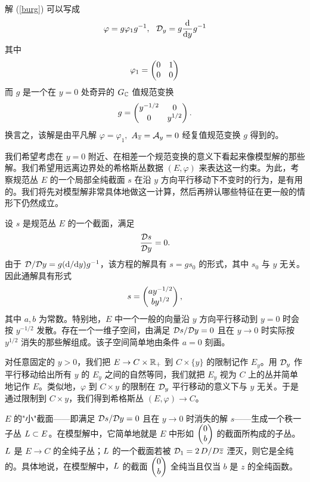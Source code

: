 解 (\ref{burg}) 可以写成
\begin{equation}\label{nolf} \varphi= g\varphi_1 g^{-1},
~~ {\mathcal D}_y=g\frac{{\mathrm d}}{{\mathrm d} y}g^{-1} \end{equation}
其中
\begin{equation}\label{zolf} \varphi_1=\begin{pmatrix} 0 & 1\cr 0 & 0 \end{pmatrix}\end{equation}
而 $g$ 是一个在 $y=0$ 处奇异的 $G_{\mathbb C}$ 值规范变换
\begin{equation}\label{singgauge}
g =\begin{pmatrix} y^{-1/2} & 0 \cr 0 & y^{1/2} \end{pmatrix}.
\end{equation}
换言之，该解是由平凡解 $\varphi=\varphi_1,$ $A_{\overline z}={\mathcal A}_y=0$ 经复值规范变换 $g$ 得到的。

我们希望考虑在 $y=0$ 附近、在相差一个规范变换的意义下看起来像模型解的那些解。我们希望用远离边界处的希格斯丛数据 $(E,\varphi)$ 来表达这一约束。为此，考察规范丛 $E$ 的一个局部全纯截面 $s$ 在沿 $y$ 方向平行移动下不变时的行为，是有用的。我们将先对模型解非常具体地做这一计算，然后再辨认哪些特征在更一般的情形下仍然成立。

设 $s$ 是规范丛 $E$ 的一个截面，满足
\begin{equation}\label{onurf}\frac{{\mathcal D} s}{{\mathcal D} y}=0.\end{equation}
由于 ${\mathcal D}/{\mathcal D} y= g ({\mathrm d}/{\mathrm d} y) g^{-1}$，该方程的解具有 $s= gs_0$ 的形式，其中 $s_0$ 与 $y$ 无关。因此通解具有形式
\begin{equation}\label{wurf} s=\begin{pmatrix} a y^{-1/2}\cr b y^{1/2}\end{pmatrix},\end{equation}
其中 $a,b$ 为常数。特别地，$E$ 中一个一般的向量沿 $y$ 方向平行移动到 $y=0$ 时会按 $y^{-1/2}$ 发散。存在一个一维子空间，由满足 ${\mathcal D} s/{\mathcal D} y=0$ 且在 $y\to 0$ 时实际按 $y^{1/2}$ 消失的那些解组成。该子空间简单地由条件 $a=0$ 刻画。

对任意固定的 $y>0$，我们把 $E\to C\times {\mathbb R}_+$ 到 $C\times \{y\}$ 的限制记作 $E_y$。用 ${\mathcal D}_y$ 作平行移动给出所有 $y$ 的 $E_y$ 之间的自然等同，我们就把 $E_y$ 视为 $C$ 上的丛并简单地记作 $E$。类似地，$\varphi$ 到 $C\times y$ 的限制在 ${\mathcal D}_y$ 平行移动的意义下与 $y$ 无关。于是通过限制到 $C\times y$，我们得到希格斯丛 $(E,\varphi)\to C$。

$E$ 的"小"截面——即满足 ${\mathcal D} s/{\mathcal D} y=0$ 且在 $y\to 0$ 时消失的解 $s$——生成一个秩一子丛 ${ L}\subset E$。在模型解中，它简单地就是 $E$ 中形如 $\begin{pmatrix}0\cr b\end{pmatrix}$ 的截面所构成的子丛。${ L}$ 是 $E\to C$ 的全纯子丛；${ L}$ 的一个截面若被 ${\mathcal D}_1=2\,D/D\overline z$ 湮灭，则它是全纯的。具体地说，在模型解中，${ L}$ 的截面 $\begin{pmatrix}0\cr b\end{pmatrix}$ 全纯当且仅当 $b$ 是 $z$ 的全纯函数。

